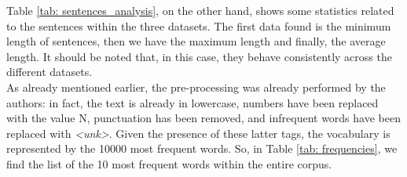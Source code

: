 \documentclass[a4paper]{article}
\begin{document}
Table \ref{tab: sentences_analysis}, on the other hand, shows some statistics related to the sentences within the three datasets. The first data found is the minimum length of sentences, then we have the maximum length and finally, the average length. It should be noted that, in this case, they behave consistently across the different datasets.
\\
As already mentioned earlier, the pre-processing was already performed by the authors: in fact, the text is already in lowercase, numbers have been replaced with the value N, punctuation has been removed, and infrequent words have been replaced with \textit{\textless unk\textgreater}. Given the presence of these latter tags, the vocabulary is represented by the 10000 most frequent words. So, in Table \ref{tab: frequencies}, we find the list of the 10 most frequent words within the entire corpus.
\\
\end{document}
